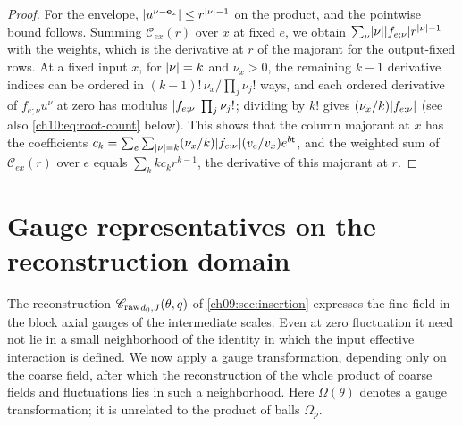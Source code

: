 \begin{proof}
For the envelope, $\lvert u^{\nu-\mathbf e_x}\rvert\le r^{\lvert \nu\rvert-1}$ on the product, and the pointwise bound follows. Summing $\mathcal C_{ex}(r)$ over $x$ at fixed $e$, we obtain $\sum_\nu\lvert \nu\rvert\lvert f_{e;\nu}\rvert r^{\lvert \nu\rvert-1}$ with the weights, which is the derivative at $r$ of the majorant for the output-fixed rows. At a fixed input $x$, for $\lvert \nu\rvert=k$ and $\nu_x>0$, the remaining $k-1$ derivative indices can be ordered in $(k-1)!\,\nu_x/\prod_j\nu_j!$ ways, and each ordered derivative of $f_{e;\nu}u^\nu$ at zero has modulus $\lvert f_{e;\nu}\rvert\prod_j\nu_j!$; dividing by $k!$ gives $(\nu_x/k)\lvert f_{e;\nu}\rvert$ (see also \eqref{ch10:eq:root-count} below). This shows that the column majorant at $x$ has the coefficients $c_k=\sum_e\sum_{\lvert \nu\rvert=k}(\nu_x/k)\lvert f_{e;\nu}\rvert(v_e/v_x)e^{b\mathsf t}$, and the weighted sum of $\mathcal C_{ex}(r)$ over $e$ equals $\sum_kkc_kr^{k-1}$, the derivative of this majorant at $r$.
\end{proof}

\section{Gauge representatives on the reconstruction domain}\label{ch10:sec:gauge}

The reconstruction ${\mathscr C_{\mathrm{raw}}}_{d_0,J}(\theta,q)$ of \cref{ch09:sec:insertion} expresses the fine field in the block axial gauges of the intermediate scales. Even at zero fluctuation it need not lie in a small neighborhood of the identity in which the input effective interaction is defined. We now apply a gauge transformation, depending only on the coarse field, after which the reconstruction of the whole product of coarse fields and fluctuations lies in such a neighborhood. Here $\Omega(\theta)$ denotes a gauge transformation; it is unrelated to the product of balls $\Omega_p$.

